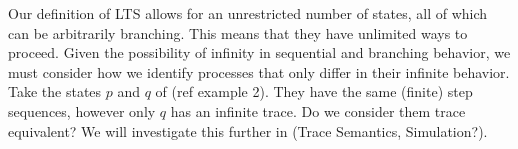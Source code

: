 \begin{isabellebody}
\begin{isamarkuptext}
\begin{center}
\end{center}%
\end{isamarkuptext}\isamarkuptrue%
%
\begin{isamarkuptext}%
Our definition of LTS allows for an unrestricted number of states, all of which can be arbitrarily branching. This means that they have unlimited ways to proceed. 
Given the possibility of infinity in sequential and branching behavior, we must consider how we identify processes that only differ in their infinite behavior. 
Take the states $p$ and $q$ of (ref example 2). They have the same (finite) step sequences, however only $q$ has an infinite trace. Do we consider them trace equivalent?
We will investigate this further in (Trace Semantics, Simulation?).%
\end{isamarkuptext}\isamarkuptrue%
\isamarkupfalse%
%
\isadelimtheory
%
\endisadelimtheory
%
\isatagtheory
%
\endisatagtheory
{\isafoldtheory}%
%
\isadelimtheory
%
\endisadelimtheory
%
\end{isabellebody}%
\endinput
